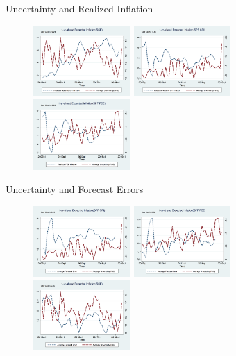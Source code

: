 \documentclass{beamer}
\begin{document}
\begin{frame}{Uncertainty and Realized Inflation}
\begin{figure}
	\centering
\label{InfVar}
\includegraphics[width=0.33\textwidth]{figuresDraft/Inf1yf_CPIAU_varSCEM.png}
\includegraphics[width=0.33\textwidth]{figuresDraft/Inf1yf_CPIAU_varSPFCPIQ.png}
\includegraphics[width=0.33\textwidth]{figuresDraft/Inf1yf_PCE_varSPFPCEQ.png}
\end{figure}
\end{frame}

\begin{frame}{Uncertainty and Forecast Errors}
\begin{figure}
	\centering
	\label{FEVar}
	\includegraphics[width=0.33\textwidth]{figuresDraft/SPFCPI_FE_varSPFCPIQ.png}
\includegraphics[width=0.33\textwidth]{figuresDraft/SPFPCE_FE_varSPFPCEQ.png}
\includegraphics[width=0.33\textwidth]{figuresDraft/SCE_FE_varSCEM.png}
\end{figure}
\end{frame}
\end{document}
